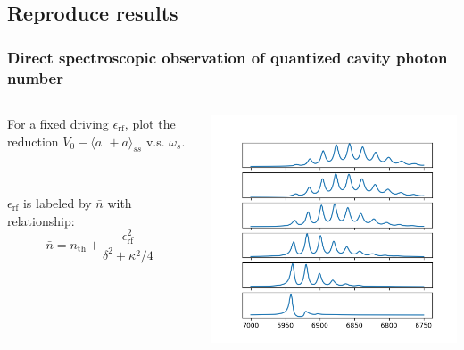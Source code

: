 \documentclass[xcolor=dvipsnames,hyperref={CJKbookmarks=true}]{beamer}
\newcommand{\rf}{\text{rf}}
\newcommand{\thm}{\text{th}}
\begin{document}
\subsection{Reproduce results}
\begin{frame}[t]\frametitle{Direct spectroscopic observation of quantized cavity photon number}
\begin{columns}
\begin{column}{0.4\linewidth}
	For a fixed driving $\epsilon_{\rf}$, plot the reduction
	$V_0 - \langle a^\dag + a\rangle_{ss}$ v.s. $\omega_{s}$. 

~

	$\epsilon_{\rf}$ is labeled by $\bar n$ with relationship:
	\begin{equation*}
		\bar n = n_{\thm} + \frac{\epsilon_{\rf}^2}{\delta^2 + \kappa^2/4}
	\end{equation*}
\end{column}%
\begin{column}{0.6\linewidth}
	\centering
    \includegraphics[width=\textwidth]{sweaping.png}
\end{column}
\end{columns}
\end{frame}
\end{document}
